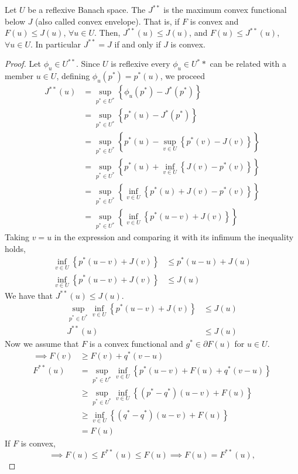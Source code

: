 \begin{theorem}
	Let $U$ be a reflexive Banach space. The $J^{**}$ is the maximum convex functional below $J$ (also called convex envelope). That is, if $F$ is convex and $F(u)\leq J(u)$, $\forall u \in U$. Then, $J^{**}(u)\leq J(u)$, and $F(u)\leq J^{**}(u)$, $\forall u \in U$. In particular $J^{**}=J$ if and only if $J$ is convex.
	\begin{proof}
		Let $\phi_u \in U^{**}$. Since $U$ is reflexive every $\phi_u \in U^**$ can be related with a member $u \in U$, defining $\phi_u(p^*)=p^*(u)$, we proceed 
		\begin{align}
			J^{**}(u)&=\sup_{p^*\in U^*} \left\lbrace \phi_u(p^*)-J^*(p^*) \right\rbrace\\
					&=\sup_{p^*\in U^*} \left\lbrace p^*(u)-J^*(p^*) \right\rbrace\\
					&=\sup_{p^*\in U^*} \left\lbrace p^*(u)-\sup_{v\in U}\left\lbrace p^*(v)-J(v)\right\rbrace\right\rbrace\\
					&=\sup_{p^*\in U^*} \left\lbrace p^*(u)+\inf_{v\in U}\left\lbrace J(v)-p^*(v)\right\rbrace\right\rbrace\\
					&=\sup_{p^*\in U^*} \left\lbrace \inf_{v\in U}\left\lbrace p^*(u)+ J(v)-p^*(v)\right\rbrace\right\rbrace\\
					&=\sup_{p^*\in U^*} \left\lbrace \inf_{v\in U}\left\lbrace p^*(u-v)+J(v)\right\rbrace\right\rbrace
		\end{align}
		Taking $v=u$ in the expression and comparing it with its infimum the inequality holds,
			\begin{align*}
				\inf_{v\in U}\left\lbrace p^* \left(u-v\right)+J(v) \right\rbrace &\leq p^*(u-u)+J(u) \\
				\inf_{v\in U}\left\lbrace p^* \left(u-v\right)+J(v) \right\rbrace &\leq J(u)
			\end{align*}
		We have that $J^{**}(u)\leq J(u)$.
		\begin{align*}
		\sup_{p^* \in U^*}\inf_{v\in U}\left\lbrace p^* \left(u-v\right)+J(v) \right\rbrace &\leq J(u)\\
		J^{**}(u) &\leq J(u)
		\end{align*}
		Now we assume that $F$ is a convex functional and $g^* \in \partial F(u)$ for $u \in U$.
		\begin{align}
			\implies  F(v)&\geq F(v)+q^*(v-u)\\
					  F^{**}(u)& = \sup_{p^* \in U^*} \inf_{v \in U} \left\lbrace p^*(u-v)+F(u)+q^*(v-u)\right\rbrace \\
					  &\geq \sup_{p^* \in U^*} \inf_{v \in U} \left\lbrace \left(p^*-q^*\right)(u-v)+F(u)\right\rbrace\\
					  &\geq \inf_{v \in U} \left\lbrace (q^*-q^*)(u-v)+F(u) \right\rbrace\\
					  &=F(u)
		\end{align}
	If $F$ is convex,
	\begin{equation}
		\implies F(u)\leq F^{**}(u)\leq F(u) \implies F(u)=F^{**}(u),
	\end{equation}


\end{proof}
\end{theorem}
